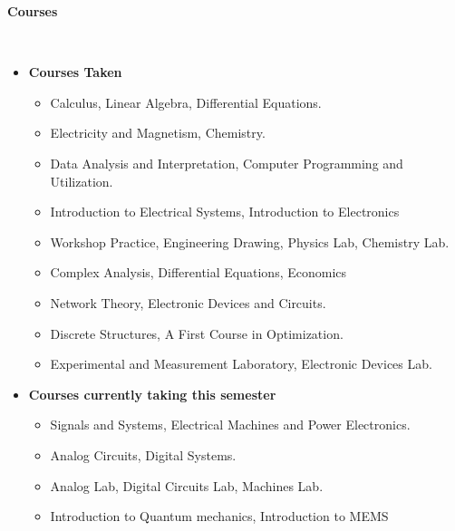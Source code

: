 \documentclass[a4paper,11pt]{article}
\newcommand{\isep}{-2 pt}
\newcommand{\lsep}{-0.5cm}
\newcommand{\resheading}[1]{{\small \colorbox{mygrey}{\begin{minipage}{0.975\textwidth}{\textbf{#1 \vphantom{p\^{E}}}}\end{minipage}}}}
\begin{document}
\resheading{\textbf{\large Courses}}\\[\lsep]
  \begin{itemize}
  \item \textbf{Courses Taken}	
	\begin{itemize}\itemsep \isep
	  \item Calculus, Linear Algebra, Differential Equations.
	  \item Electricity and Magnetism, Chemistry. \\
	  \item Data Analysis and Interpretation, Computer Programming and Utilization.
	  \item Introduction to Electrical Systems, Introduction to Electronics 
	  \item Workshop Practice, Engineering Drawing, Physics Lab, Chemistry Lab. \\
	  \item Complex Analysis, Differential Equations, Economics 
	  \item Network Theory, Electronic Devices and Circuits. \\
	  \item Discrete Structures, A First Course in Optimization.
	  \item Experimental and Measurement Laboratory, Electronic Devices Lab.
	\end{itemize}
 \item \textbf{Courses currently taking this semester}
 	\begin{itemize} \itemsep \isep
 	  \item Signals and Systems, Electrical Machines and Power Electronics.
 	  \item Analog Circuits, Digital Systems.
 	  \item Analog Lab, Digital Circuits Lab, Machines Lab.
 	  \item Introduction to Quantum mechanics, Introduction to MEMS
 	\end{itemize}
\end{itemize}
\end{document}
